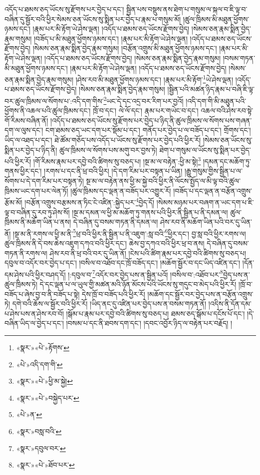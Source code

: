 འདོད་པ་ཐམས་ཅད་ཡོངས་སུ་རྫོགས་པར་བྱེད་པ་དང་། སྦྱིན་པས་བསྡུས་ནས་ཐེག་པ་གསུམ་ལ་སྐལ་བ་ཇི་ལྟ་བ་བཞིན་དུ་སྦྱོར་བའི་ཕྱིར་སེམས་ཅན་ཡོངས་སུ་སྨིན་པར་བྱེད་པ་རྣམ་པ་གསུམ་མོ། །ཚུལ་ཁྲིམས་མི་མཐུན་ཕྱོགས་ཉམས་དང་། །རྣམ་པར་མི་རྟོག་ཡེ་ཤེས་ལྡན། །འདོད་པ་ཐམས་ཅད་ཡོངས་རྫོགས་བྱེད། །སེམས་ཅན་རྣམ་སྨིན་བྱེད་རྣམ་གསུམ། །བཟོད་པ་མི་མཐུན་ཕྱོགས་ཉམས་དང་། །རྣམ་པར་མི་རྟོག་ཡེ་ཤེས་ལྡན། །འདོད་པ་ཐམས་ཅད་ཡོངས་རྫོགས་བྱེད། །སེམས་ཅན་རྣམ་སྨིན་བྱེད་རྣམ་གསུམ། །བརྩོན་འགྲུས་མི་མཐུན་ཕྱོགས་ཉམས་དང་། །རྣམ་པར་མི་རྟོག་ཡེ་ཤེས་ལྡན། །འདོད་པ་ཐམས་ཅད་ཡོངས་རྫོགས་བྱེད། །སེམས་ཅན་རྣམ་སྨིན་བྱེད་རྣམ་གསུམ། །བསམ་གཏན་མི་མཐུན་ཕྱོགས་ཉམས་དང་། །རྣམ་པར་མི་རྟོག་ཡེ་ཤེས་ལྡན། །འདོད་པ་ཐམས་ཅད་ཡོངས་རྫོགས་བྱེད། །སེམས་ཅན་རྣམ་སྨིན་བྱེད་རྣམ་གསུམ། །ཤེས་རབ་མི་མཐུན་ཕྱོགས་ཉམས་དང་། །རྣམ་པར་མི་རྟོག་\footnote{«སྣར་»«པེ་»རྟོགས་}ཡེ་ཤེས་ལྡན། །འདོད་པ་ཐམས་ཅད་ཡོངས་རྫོགས་བྱེད། །སེམས་ཅན་རྣམ་སྨིན་བྱེད་རྣམ་གསུམ། །སྦྱིན་པའི་མཚན་ཉིད་རྣམ་པ་བཞི་ཇི་ལྟ་བར་ཚུལ་ཁྲིམས་ལ་སོགས་པ་:འདི་དག་གིས་\footnote{«པེ་»འདི་དག་གི་}ཡང་དེ་དང་འདྲ་བར་རིག་པར་བྱའོ། །འདི་དག་གི་མི་མཐུན་པའི་ཕྱོགས་ནི་འཆལ་པའི་ཚུལ་ཁྲིམས་དང་། ཁྲོ་བ་དང་། ལེ་ལོ་དང་། རྣམ་པར་གཡེང་བ་དང་། འཆལ་བའི་ཤེས་རབ་སྟེ་གོ་རིམས་བཞིན་ནོ། །འདོད་པ་ཐམས་ཅད་ཡོངས་སུ་རྫོགས་པར་བྱེད་པ་ཉིད་ནི་ཚུལ་ཁྲིམས་ལ་སོགས་པས་གཞན་དག་ལ་ལུས་དང་། ངག་ཐམས་ཅད་ཡང་དག་པར་སྡོམ་པ་དང་། གནོད་པར་བྱེད་པ་ལ་བཟོད་པ་དང་། གྲོགས་དང་། ཡིད་ལ་འཐད་པ་དང་། ཐེ་ཚོམ་གཅོད་པས་འདོད་པ་ཡོངས་སུ་རྫོགས་པར་བྱེད་པའི་ཕྱིར་རོ། །སེམས་ཅན་ཡོངས་སུ་སྨིན་པར་བྱེད་པ་ཉིད་ནི། ཚུལ་ཁྲིམས་ལ་སོགས་པས་མགུ་བར་བྱས་ཏེ། ཐེག་པ་གསུམ་ལ་ཡོངས་སུ་སྨིན་པར་བྱེད་པའི་ཕྱིར་རོ། །གོ་རིམས་རྣམ་པར་དབྱེ་བའི་ཚིགས་སུ་བཅད་པ། །སྔ་མ་ལ་བརྟེན་:ཕྱི་མ་སྟེ།\footnote{«སྣར་»«པེ་»ཕྱི་མ་སྐྱེ།} །དམན་དང་མཆོག་ཏུ་གནས་ཕྱིར་དང་། །རགས་པ་དང་ནི་ཕྲ་བའི་ཕྱིར། །དེ་དག་རིམ་པར་བསྟན་པ་ཡིན། །རྒྱུ་གསུམ་གྱིས་སྦྱིན་པ་ལ་སོགས་པ་དེ་དག་རིམ་པར་བསྟན་ཏེ། སྔ་མ་ལ་བརྟེན་ནས་ཕྱི་མ་སྐྱེ་བའི་ཕྱིར་ནི་ལོངས་སྤྱོད་ལ་མི་ལྟ་བའི་ཚུལ་ཁྲིམས་ཡང་དག་པར་ལེན་ཏོ། །ཚུལ་ཁྲིམས་དང་ལྡན་ན་བཟོད་པར་འགྱུར་རོ། །བཟོད་པ་དང་ལྡན་ན་བརྩོན་འགྲུས་རྩོམ་མོ། །བརྩོན་འགྲུས་བརྩམས་ན་ཏིང་ངེ་འཛིན་:སྐྱེད་པར་\footnote{«སྣར་»«པེ་»བསྐྱེད་པར་}བྱེད་དོ། །སེམས་མཉམ་པར་བཞག་ན་ཡང་དག་པ་ཇི་ལྟ་བ་བཞིན་དུ་རབ་ཏུ་ཤེས་སོ། །སྔ་མ་དམན་ལ་ཕྱི་མ་མཆོག་ཏུ་གནས་པའི་ཕྱིར་ནི་སྦྱིན་པ་ནི་དམན་ལ། ཚུལ་ཁྲིམས་ནི་མཆོག་ཡིན་པ་ནས། དེ་བཞིན་དུ་བསམ་གཏན་ནི་དམན་ལ། ཤེས་རབ་ནི་མཆོག་ཡིན་པའི་བར་དུ་ཡིན་ནོ། །སྔ་མ་ནི་རགས་ལ་ཕྱི་མ་ནི་\footnote{«པེ་»ན་}ཕྲ་བའི་ཕྱིར་ནི་སྦྱིན་པ་ནི་འཇུག་:སླ་བའི་\footnote{«སྣར་»བསླ་བའི་}ཕྱིར་དང་། བྱ་སླ་བའི་ཕྱིར་རགས་ལ། ཚུལ་ཁྲིམས་ནི་དེ་བས་ཆེས་འཇུག་དཀའ་བའི་ཕྱིར་དང་། ཆེས་བྱ་དཀའ་བའི་ཕྱིར་ཕྲ་བ་ནས། དེ་བཞིན་དུ་བསམ་གཏན་ནི་རགས་ལ། ཤེས་རབ་ནི་ཕྲ་བའི་བར་དུ་ཡིན་ནོ། །ངེས་པའི་ཚིག་རྣམ་པར་དབྱེ་བའི་ཚིགས་སུ་བཅད་པ། དབུལ་བ་འདོར་བར་བྱེད་པ་དང་། །བསིལ་བ་འཐོབ་དང་ཁྲོ་བཟོད་དང་། །མཆོག་སྦྱོར་བ་དང་ཡིད་འཛིན་དང་། །དོན་དམ་ཤེས་པའི་ཕྱིར་བཤད་དོ། །:དབུལ་བ་\footnote{«སྣར་»དབུལ་བར་}འདོར་བར་བྱེད་པས་ན་སྦྱིན་པའོ། །བསིལ་བ་:འཐོབ་པར་\footnote{«སྣར་»«པེ་»ཐོབ་པར་}བྱེད་པས་ན་ཚུལ་ཁྲིམས་ཏེ། དེ་དང་ལྡན་པ་ལ་ཡུལ་གྱི་མཚན་མའི་ཉོན་མོངས་པའི་ཡོངས་སུ་གདུང་བ་མེད་པའི་ཕྱིར་རོ། །ཁྲོ་བ་བཟོད་པ་ཞེས་བྱ་བ་ནི་བཟོད་པ་སྟེ། དེས་ཁྲོ་བ་བཟོད་པའི་ཕྱིར་རོ། །མཆོག་དང་སྦྱོར་བར་བྱེད་པས་ན་བརྩོན་འགྲུས་ཏེ། དགེ་བའི་ཆོས་ལ་སྦྱོར་བའི་ཕྱིར་རོ། །ཡིད་ནང་དུ་འཛིན་པར་བྱེད་པས་ན་བསམ་གཏན་ནོ། །འདིས་ནི་དོན་དམ་པ་ཤེས་པས་ན་ཤེས་རབ་བོ། །སྒོམ་པ་རྣམ་པར་དབྱེ་བའི་ཚིགས་སུ་བཅད་པ། ཐམས་ཅད་སྒོམ་པ་དངོས་པོ་དང་། །དེ་བཞིན་ཡིད་ལ་བྱེད་པ་དང་། །བསམ་པ་དང་ནི་ཐབས་དག་དང་། །དབང་འབྱོར་ཉིད་ལ་བརྟེན་པར་བརྗོད། །
